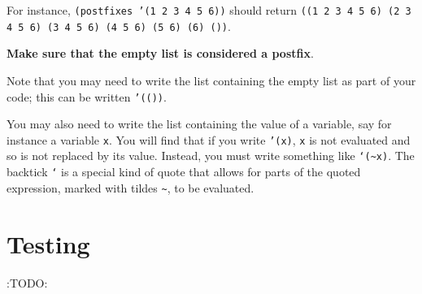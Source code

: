 \documentclass[11pt]{article}
\begin{document}
For instance, \texttt{(postfixes '(1 2 3 4 5 6))} should
return \texttt{((1 2 3 4 5 6) (2 3 4 5 6) (3 4 5 6) (4 5 6) (5 6) (6) ())}.

\textbf{Make sure that the empty list is considered a postfix}.

Note that you may need to write the list containing the empty list
as part of your code; this can be written \texttt{'(())}.

You may also need to write the list containing the value of a variable,
say for instance a variable \texttt{x}. You will find that
if you write \texttt{'(x)}, \texttt{x} is not evaluated and so is not replaced by its value.
Instead, you must write something like \texttt{`(\textasciitilde{}x)}. The backtick \texttt{`} is a special
kind of quote that allows for parts of the quoted expression,
marked with tildes \texttt{\textasciitilde{}}, to be evaluated.

\section*{Testing}
\label{sec:org7e55c66}
:TODO:
\end{document}
